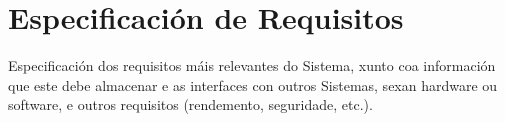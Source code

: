 \chapter{Especificación de Requisitos}

Especificación dos requisitos máis relevantes do Sistema, xunto coa información que este debe almacenar e as interfaces
con outros Sistemas, sexan hardware ou software, e outros requisitos (rendemento, seguridade, etc.).
